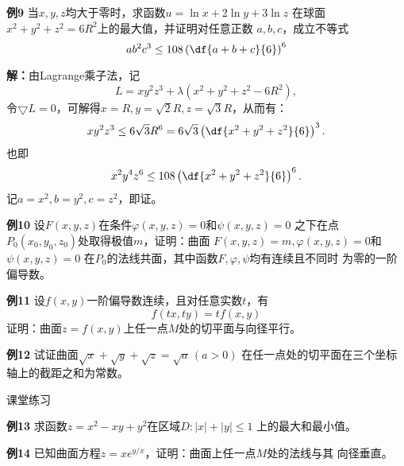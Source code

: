 \begin{frame}
	\linespread{1.2}
	\begin{exampleblock}{{\bf 例9}\hfill}
		当$x,y,z$均大于零时，求函数$u=\ln x+2\ln y+3\ln z$
		在球面$x^2+y^2+z^2=6R^2$上的最大值，并证明对任意正数
		$a,b,c$，成立不等式
		$$ab^2c^3\leq 108\left(\df{a+b+c}{6}\right)^6$$
	\end{exampleblock}
\end{frame}

\begin{frame}
	\linespread{1.2}
	{\small
		{\bf 解：}由Lagrange乘子法，记
		$$L=xy^2z^3+\lambda(x^2+y^2+z^2-6R^2),$$
		令$\bigtriangledown L=0$，可解得$x=R,y=\sqrt2 R,z=\sqrt3 R$，从而有：
		$$xy^2z^3\leq 6\sqrt 3R^6=6\sqrt 3\left(\df{x^2+y^2+z^2}{6}\right)^3.$$
		也即
		$$x^2y^4z^6\leq 108\left(\df{x^2+y^2+z^2}{6}\right)^6.$$
		记$a=x^2,b=y^2,c=z^2$，即证。
	}
\end{frame}

\begin{frame}
	\linespread{1.4}
	\begin{exampleblock}{{\bf 例10}\hfill}
		设$F(x,y,z)$在条件$\varphi(x,y,z)=0$和$\psi(x,y,z)=0$
		之下在点$P_0(x_0,y_0,z_0)$处取得极值$m$，证明：曲面
		$F(x,y,z)=m,\varphi(x,y,z)=0$和$\psi(x,y,z)=0$
		在$P_0$的法线共面，其中函数$F,\varphi,\psi$均有连续且不同时
		为零的一阶偏导数。
	\end{exampleblock}
\end{frame}

\begin{frame}
	\linespread{1.2}
	\begin{exampleblock}{{\bf 例11}\hfill}
		设$f(x,y)$一阶偏导数连续，且对任意实数$t$，有
		$$f(tx,ty)=tf(x,y)$$
		证明：曲面$z=f(x,y)$上任一点$M$处的切平面与向径平行。
	\end{exampleblock}
	\pause
	\bigskip
	\begin{exampleblock}{{\bf 例12}\hfill}
		试证曲面$\sqrt{x}+\sqrt y+\sqrt z=\sqrt a\,(a>0)$
		在任一点处的切平面在三个坐标轴上的截距之和为常数。
	\end{exampleblock}
\end{frame}

\begin{frame}{课堂练习}
	\linespread{1.2}
	\begin{exampleblock}{{\bf 例13}\hfill}
		求函数$z=x^2-xy+y^2$在区域$D:|x|+|y|\leq 1$
		上的最大和最小值。
	\end{exampleblock}
	\bigskip
	\begin{exampleblock}{{\bf 例14}\hfill}
		已知曲面方程$z=xe^{y/x}$，证明：曲面上任一点$M$处的法线与其
		向径垂直。
	\end{exampleblock}
\end{frame}

 
% 
